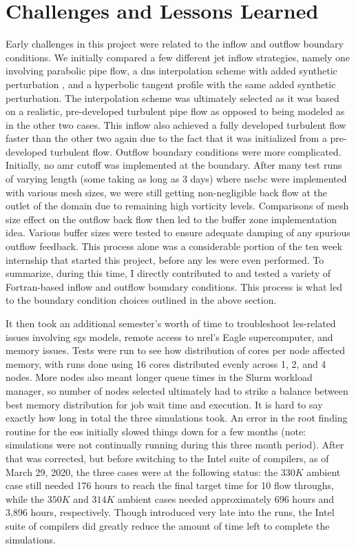 \section{Challenges and Lessons Learned}
Early challenges in this project were related to the inflow and outflow boundary conditions. We initially compared a few different jet inflow strategies, namely one involving parabolic pipe flow, a \gls{dns} interpolation scheme with added synthetic perturbation \cite{}, and a hyperbolic tangent profile with the same added synthetic perturbation. The interpolation scheme was ultimately selected as it was based on a realistic, pre-developed turbulent pipe flow \cite{} as opposed to being modeled as in the other two cases. This inflow also achieved a fully developed turbulent flow faster than the other two again due to the fact that it was initialized from a pre-developed turbulent flow. Outflow boundary conditions were more complicated. Initially, no \gls{amr} cutoff was implemented at the boundary. After many test runs of varying length (some taking as long as 3 days) where \gls{nscbc} were implemented \cite{} with various mesh sizes, we were still getting non-negligible back flow at the outlet of the domain due to remaining high vorticity levels. Comparisons of mesh size effect on the outflow back flow then led to the buffer zone implementation idea. Various buffer sizes were tested to ensure adequate damping of any spurious outflow feedback. This process alone was a considerable portion of the ten week internship that started this project, before any \gls{les} were even performed. To summarize, during this time, I directly contributed to and tested a variety of Fortran-based inflow and outflow boundary conditions. This process is what led to the boundary condition choices outlined in the above section.

It then took an additional semester's worth of time to troubleshoot \gls{les}-related issues involving \gls{sgs} models, remote access to \gls{nrel}'s Eagle supercomputer, and memory issues. Tests were run to see how distribution of cores per node affected memory, with runs done using 16 cores distributed evenly across 1, 2, and 4 nodes. More nodes also meant longer queue times in the Slurm workload manager, so number of nodes selected ultimately had to strike a balance between best memory distribution for job wait time and execution. It is hard to say exactly how long in total the three simulations took. An error in the root finding routine for the \gls{eos} initially slowed things down for a few months (note: simulations were not continually running during this three month period). After that was corrected, but before switching to the Intel suite of compilers, as of March 29, 2020, the three cases were at the following status: the $330 K$ ambient case still needed 176 hours to reach the final target time for 10 flow throughs, while the $350 K$ and $314 K$ ambient cases needed approximately 696 hours and 3,896 hours, respectively. Though introduced very late into the runs, the Intel suite of compilers did greatly reduce the amount of time left to complete the simulations. 

